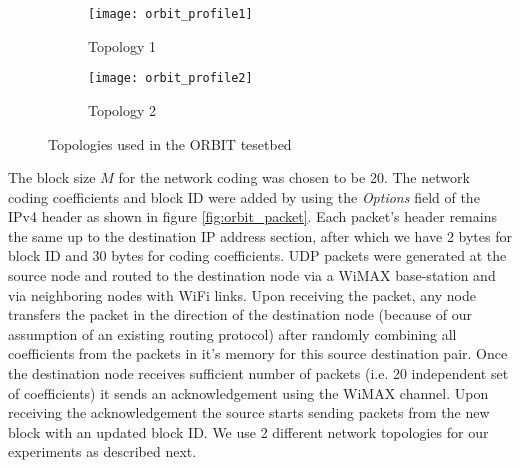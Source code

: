 \documentclass{sig-alternate-10pt}
\begin{document}
\begin{figure}
        \centering
        \begin{subfigure}[b]{0.43\textwidth}
        \centering
                \texttt{[image: orbit\_profile1]}
                \caption{Topology 1}\vspace{1cm}
                \label{fig:topo1}
        \end{subfigure}
        
        \begin{subfigure}[b]{0.45\textwidth}
        \centering
                \texttt{[image: orbit\_profile2]}
                \caption{Topology 2}
                \label{fig:topo2}
        \end{subfigure}
        \caption{Topologies used in the ORBIT tesetbed}\label{fig:topos}
\end{figure}

The block size $M$ for the network coding was chosen to be 20.  The network coding coefficients and block ID were added by using the \emph{Options} field of the IPv4 header as shown in figure \ref{fig:orbit_packet}. Each packet's header  remains the same up to the destination IP address section, after which we have 2 bytes for block ID and 30 bytes for coding coefficients.  UDP packets were generated at the source node and routed  to the destination node via a WiMAX base-station and via neighboring nodes with WiFi links. Upon receiving the packet, any node transfers the packet in the direction of the destination node (because of our assumption of an existing routing protocol) after randomly combining all coefficients from the packets in it's memory for this source destination pair. Once the destination node receives sufficient number of packets (i.e. 20 independent set of coefficients) it sends an acknowledgement using the WiMAX channel. Upon receiving the acknowledgement the source starts sending packets from the new block with an updated block ID. We use 2 different network topologies for our experiments as described next.
\end{document}
